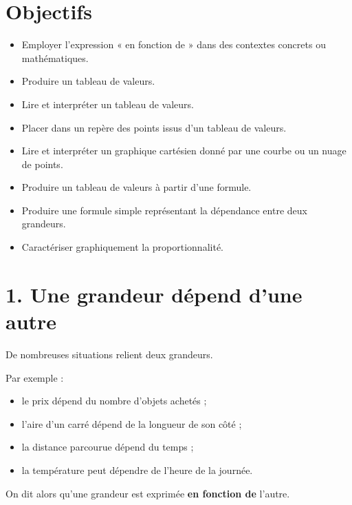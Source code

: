 
\section{Objectifs}

\begin{itemize}
\item Employer l'expression « en fonction de » dans des contextes concrets ou mathématiques.
\item Produire un tableau de valeurs.
\item Lire et interpréter un tableau de valeurs.
\item Placer dans un repère des points issus d'un tableau de valeurs.
\item Lire et interpréter un graphique cartésien donné par une courbe ou un nuage de points.
\item Produire un tableau de valeurs à partir d'une formule.
\item Produire une formule simple représentant la dépendance entre deux grandeurs.
\item Caractériser graphiquement la proportionnalité.
\end{itemize}

\section{1. Une grandeur dépend d'une autre}

De nombreuses situations relient deux grandeurs.

Par exemple :
\begin{itemize}
\item le prix dépend du nombre d'objets achetés ;
\item l'aire d'un carré dépend de la longueur de son côté ;
\item la distance parcourue dépend du temps ;
\item la température peut dépendre de l'heure de la journée.
\end{itemize}

On dit alors qu'une grandeur est exprimée \textbf{en fonction de} l'autre.



